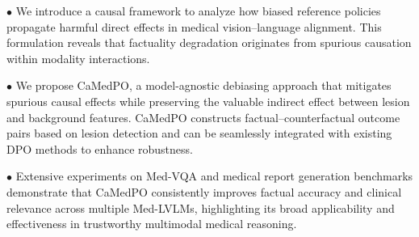 \noindent $\bullet$ We introduce a causal framework to analyze how biased reference policies propagate harmful direct effects in medical vision–language alignment. This formulation reveals that factuality degradation originates from spurious causation within modality interactions.

\noindent$\bullet$ We propose CaMedPO, a model-agnostic debiasing approach that mitigates spurious causal effects while preserving the valuable indirect effect between lesion and background features. CaMedPO constructs factual–counterfactual outcome pairs based on lesion detection and can be seamlessly integrated with existing DPO methods to enhance robustness.

\noindent$\bullet$ Extensive experiments on Med-VQA and medical report generation benchmarks demonstrate that CaMedPO consistently improves factual accuracy and clinical relevance across multiple Med-LVLMs, highlighting its broad applicability and effectiveness in trustworthy multimodal medical reasoning.